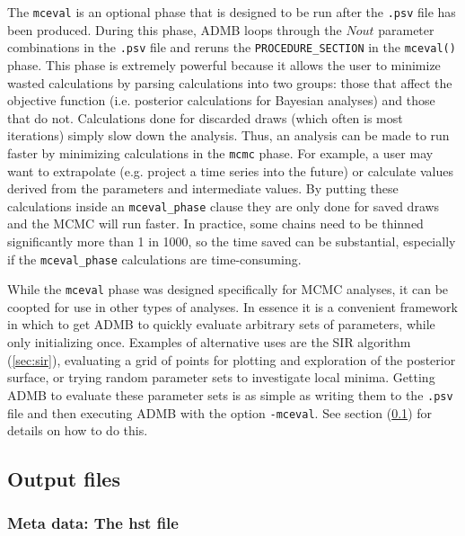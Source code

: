 \documentclass{article}\usepackage[]{graphicx}\usepackage[]{color}
\begin{document}
The \texttt{mceval} is an optional phase that is designed to
be run after the \texttt{.psv} file has been
produced. During this phase, ADMB loops through the $Nout$
parameter combinations in the \texttt{.psv} file and reruns
the \texttt{PROCEDURE\_SECTION} in the \texttt{mceval()}
phase. This phase is extremely powerful because it allows
the user to minimize wasted calculations by parsing
calculations into two groups: those that affect the
objective function (i.e. posterior calculations for Bayesian
analyses) and those that do not. Calculations done for
discarded draws (which often is most iterations) simply slow
down the analysis. Thus, an analysis can be made to run
faster by minimizing calculations in the \texttt{mcmc}
phase.  For example, a user may want to extrapolate
(e.g. project a time series into the future) or calculate
values derived from the parameters and intermediate
values. By putting these calculations inside an
\texttt{mceval\_phase} clause they are only done for saved
draws and the MCMC will run faster. In practice, some chains
need to be thinned significantly more than 1 in 1000, so the
time saved can be substantial, especially if the
\texttt{mceval\_phase} calculations are time-consuming.

While the \texttt{mceval} phase was designed specifically
for MCMC analyses, it can be coopted for use in other types
of analyses. In essence it is a convenient framework in
which to get ADMB to quickly evaluate arbitrary sets of
parameters, while only initializing once. Examples of
alternative uses are the SIR algorithm (\ref{sec:sir}),
evaluating a grid of points for plotting and exploration of
the posterior surface, or trying random parameter sets to
investigate local minima. Getting ADMB to evaluate these
parameter sets is as simple as writing them to the
\texttt{.psv} file and then executing ADMB with the option
\texttt{-mceval}. See section (\ref{sec:outfiles}) for
details on how to do this.


\subsection{Output files}\label{sec:outfiles}
\subsubsection{Meta data: The hst file}
\end{document}
